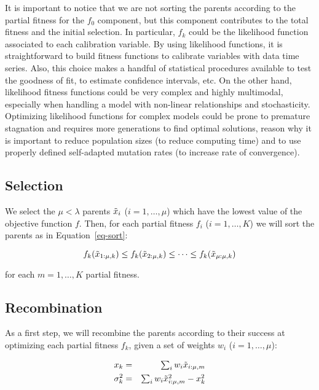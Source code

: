 It is important to notice that we are not sorting the parents according to the partial fitness for the $f_0$ component, but this component contributes to the total fitness and the initial selection.
In particular, $f_k$ could be the likelihood function associated to each calibration variable. By using likelihood functions, it is straightforward to build fitness functions to calibrate variables with data time series. Also, this choice makes a handful of statistical procedures available to test the goodness of fit, to estimate confidence intervals, etc. On the other hand, likelihood fitness functions could be very complex and highly multimodal, especially when handling a model with non-linear relationships and stochasticity. Optimizing likelihood functions for complex models could be prone to premature stagnation and requires more generations to find optimal solutions, reason why it is important to reduce population sizes (to reduce computing time) and to use properly defined self-adapted mutation rates (to increase rate of convergence).

\subsection{Selection}

We select the $\mu<\lambda$ parents $\tilde{x}_i$ ($i=1, \dots, \mu$) which have the lowest value of the objective function $f$.
 Then, for each partial fitness $f_i$ ($i=1, \dots, K$) we will sort the parents as in Equation~\eqref{eq-sort}:
 
\begin{equation}
f_k(\tilde{x}_{1:\mu,k}) \leq f_k(\tilde{x}_{2:\mu,k}) \leq \dots \leq f_k(\tilde{x}_{\mu:\mu,k})
\label{eq-sort2}
\end{equation}

\noindent for each $m=1, \dots, K$ partial fitness.

\subsection{Recombination}

As a first step, we will recombine the parents according to their success at optimizing each partial fitness $f_k$, given a set of weights $w_i$ ($i=1, \dots, \mu$):

\begin{eqnarray}
x_k& = & \textstyle \sum_iw_i \tilde{x}_{i:\mu, m}\\ 
\sigma_k^2 & = & \textstyle \sum_iw_i\tilde{x}_{i:\mu, m}^2 - x_k^2
\end{eqnarray}

